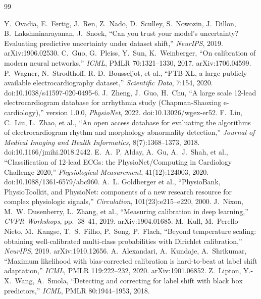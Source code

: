 \documentclass[review,12pt,nonatbib]{elsarticle}
\begin{document}
\begin{thebibliography}{99}
\raggedright
 Y.~Ovadia, E.~Fertig, J.~Ren, Z.~Nado,
D.~Sculley, S.~Nowozin, J.~Dillon, B.~Lakshminarayanan, J.~Snoek,
``Can you trust your model's uncertainty? Evaluating predictive
uncertainty under dataset shift,'' \emph{NeurIPS}, 2019.
arXiv:1906.02530.
 C.~Guo, G.~Pleiss, Y.~Sun, K.~Weinberger,
``On calibration of modern neural networks,'' \emph{ICML}, PMLR
70:1321--1330, 2017. arXiv:1706.04599.
 P.~Wagner, N.~Strodthoff, R.-D.~Bousseljot,
et al., ``PTB-XL, a large publicly available electrocardiography
dataset,'' \emph{Scientific Data}, 7:154, 2020.
doi:10.1038/s41597-020-0495-6.
 J.~Zheng, J.~Guo, H.~Chu,
``A large scale 12-lead electrocardiogram database for arrhythmia
study (Chapman-Shaoxing e-cardiology),'' version 1.0.0,
\emph{PhysioNet}, 2022. doi:10.13026/wgex-er52.
 F.~Liu, C.~Liu, L.~Zhao, et al., ``An open
access database for evaluating the algorithms of electrocardiogram
rhythm and morphology abnormality detection,'' \emph{Journal of
Medical Imaging and Health Informatics}, 8(7):1368--1373, 2018.
doi:10.1166/jmihi.2018.2442.
 E.~A.~P. Alday, A.~Gu, A.~J.~Shah, et al.,
``Classification of 12-lead ECGs: the PhysioNet/Computing in
Cardiology Challenge 2020,'' \emph{Physiological Measurement},
41(12):124003, 2020. doi:10.1088/1361-6579/abc960.
 A.~L. Goldberger et al., ``PhysioBank,
PhysioToolkit, and PhysioNet: components of a new research resource
for complex physiologic signals,'' \emph{Circulation},
101(23):e215--e220, 2000.
 J.~Nixon, M.~W. Dusenberry, L.~Zhang, et al.,
``Measuring calibration in deep learning,'' \emph{CVPR Workshops},
pp.~38--41, 2019. arXiv:1904.01685.
 M.~Kull, M.~Perello-Nieto, M.~Kangse,
T.~S.~Filho, P.~Song, P.~Flach, ``Beyond temperature scaling:
obtaining well-calibrated multi-class probabilities with Dirichlet
calibration,'' \emph{NeurIPS}, 2019. arXiv:1910.12656.
 A.~Alexandari, A.~Kundaje, A.~Shrikumar,
``Maximum likelihood with bias-corrected calibration is hard-to-beat
at label shift adaptation,'' \emph{ICML}, PMLR 119:222--232, 2020.
arXiv:1901.06852.
 Z.~Lipton, Y.-X.~Wang, A.~Smola,
``Detecting and correcting for label shift with black box
predictors,'' \emph{ICML}, PMLR 80:1944--1953, 2018.

\end{thebibliography}
\end{document}
